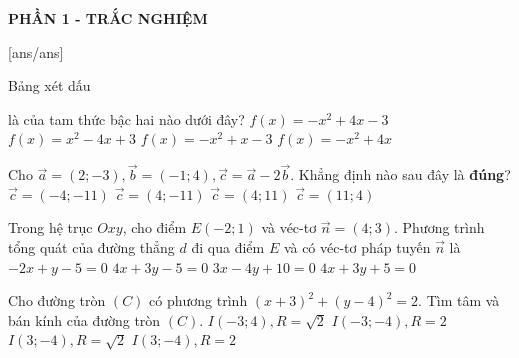 


\begin{center}
	\textbf{PHẦN 1 - TRẮC NGHIỆM}
\end{center}
[ans/ans]
\begin{ex}%
	Bảng xét dấu
	\begin{center}
	\end{center}
	là của tam thức bậc hai nào dưới đây?
	\choice
	{\True $f(x)=-x^2 +4x -3$}
	{$f(x)=x^2 -4x +3$}
	{$f(x)=-x^2 +x -3$}
	{$f(x)=-x^2 +4x $}
\end{ex}
\begin{ex}%
	Cho $\vec{a} = (2;-3), \vec{b} = (-1;4), \vec{c} =  \vec{a} - 2\vec{b}$. Khẳng định nào sau đây là \textbf{đúng}?
	\choice
	{$\vec{c} = (-4;-11)$}
	{\True $\vec{c} = (4;-11)$}
	{$\vec{c} = (4;11)$}
	{$\vec{c} = (11;4)$}
\end{ex}
\begin{ex}%
	Trong hệ trục $Oxy$, cho điểm $E(-2;1)$ và véc-tơ $\vec{n}=(4;3)$. Phương trình tổng quát của đường thẳng $d$ đi qua điểm $E$ và có véc-tơ pháp tuyến $\vec{n}$ là
	\choice
	{$-2x+y-5=0$}
	{$4x+3y-5=0$}
	{$3x-4y+10=0$}
	{\True $4x+3y+5=0$}
\end{ex}
\begin{ex}%
	Cho đường tròn $(C)$ có phương trình $(x+3)^2 + (y-4)^2 =2$. Tìm tâm và bán kính của đường tròn $(C)$.
	\choice
	{\True $I(-3; 4), R=\sqrt{2}$}
	{$I(-3; -4), R=2$}
	{$I(3; -4), R=\sqrt{2}$}
	{$I(3; -4), R=2$}
\end{ex}

